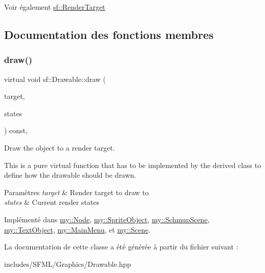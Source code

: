 \begin{DoxySeeAlso}{Voir également}
\hyperlink{classsf_1_1RenderTarget}{sf\+::\+Render\+Target} 
\end{DoxySeeAlso}


\subsection{Documentation des fonctions membres}
\mbox{\label{classsf_1_1Drawable_a90d2c88bba9b035a0844eccb380ef631}} 
\subsubsection{\texorpdfstring{draw()}{draw()}}
{\footnotesize\ttfamily virtual void sf\+::\+Drawable\+::draw (\begin{DoxyParamCaption}\item[{\hyperlink{classsf_1_1RenderTarget}{Render\+Target} \&}]{target,  }\item[{\hyperlink{classsf_1_1RenderStates}{Render\+States}}]{states }\end{DoxyParamCaption}) const\hspace{0.3cm}{\ttfamily [protected]}, {}}



Draw the object to a render target. 

This is a pure virtual function that has to be implemented by the derived class to define how the drawable should be drawn.


\begin{DoxyParams}{Paramètres}
{\em target} & Render target to draw to \\
\hline
{\em states} & Current render states \\
\hline
\end{DoxyParams}


Implémenté dans \hyperlink{classmy_1_1Node_a71ddeab220702a1329e436d890ba5c19}{my\+::\+Node}, \hyperlink{classmy_1_1SpriteObject_a6dbc79fd834894570763f975c5de7920}{my\+::\+Sprite\+Object}, \hyperlink{classmy_1_1SchmupScene_ac31669b2ef8cded3274eb06338812b11}{my\+::\+Schmup\+Scene}, \hyperlink{classmy_1_1TextObject_aaa3cb42fe369ae9c6f8d1f4e495b3d7b}{my\+::\+Text\+Object}, \hyperlink{classmy_1_1MainMenu_af378fdb76cb97944ee6b5501933ee669}{my\+::\+Main\+Menu}, et \hyperlink{classmy_1_1Scene_a1e3c785189d466d509f864e70303cbe1}{my\+::\+Scene}.



La documentation de cette classe a été générée à partir du fichier suivant \+:\begin{DoxyCompactItemize}
\item 
includes/\+S\+F\+M\+L/\+Graphics/Drawable.\+hpp\end{DoxyCompactItemize}
